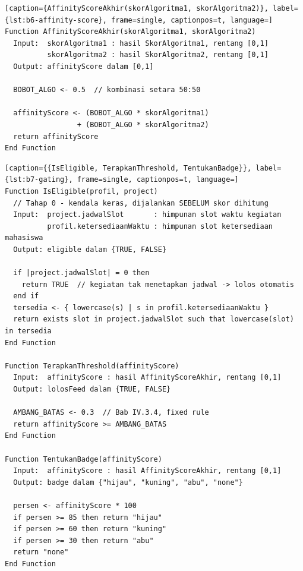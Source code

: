 \begin{minipage}{\textwidth}
\begin{lstlisting}[caption={AffinityScoreAkhir(skorAlgoritma1, skorAlgoritma2)}, label={lst:b6-affinity-score}, frame=single, captionpos=t, language=]
Function AffinityScoreAkhir(skorAlgoritma1, skorAlgoritma2)
  Input:  skorAlgoritma1 : hasil SkorAlgoritma1, rentang [0,1]
          skorAlgoritma2 : hasil SkorAlgoritma2, rentang [0,1]
  Output: affinityScore dalam [0,1]

  BOBOT_ALGO <- 0.5  // kombinasi setara 50:50

  affinityScore <- (BOBOT_ALGO * skorAlgoritma1)
                 + (BOBOT_ALGO * skorAlgoritma2)
  return affinityScore
End Function
\end{lstlisting}
\end{minipage}

\begin{minipage}{\textwidth}
\begin{lstlisting}[caption={{IsEligible, TerapkanThreshold, TentukanBadge}}, label={lst:b7-gating}, frame=single, captionpos=t, language=]
Function IsEligible(profil, project)
  // Tahap 0 - kendala keras, dijalankan SEBELUM skor dihitung
  Input:  project.jadwalSlot       : himpunan slot waktu kegiatan
          profil.ketersediaanWaktu : himpunan slot ketersediaan mahasiswa
  Output: eligible dalam {TRUE, FALSE}

  if |project.jadwalSlot| = 0 then
    return TRUE  // kegiatan tak menetapkan jadwal -> lolos otomatis
  end if
  tersedia <- { lowercase(s) | s in profil.ketersediaanWaktu }
  return exists slot in project.jadwalSlot such that lowercase(slot) in tersedia
End Function

Function TerapkanThreshold(affinityScore)
  Input:  affinityScore : hasil AffinityScoreAkhir, rentang [0,1]
  Output: lolosFeed dalam {TRUE, FALSE}

  AMBANG_BATAS <- 0.3  // Bab IV.3.4, fixed rule
  return affinityScore >= AMBANG_BATAS
End Function

Function TentukanBadge(affinityScore)
  Input:  affinityScore : hasil AffinityScoreAkhir, rentang [0,1]
  Output: badge dalam {"hijau", "kuning", "abu", "none"}

  persen <- affinityScore * 100
  if persen >= 85 then return "hijau"
  if persen >= 60 then return "kuning"
  if persen >= 30 then return "abu"
  return "none"
End Function
\end{lstlisting}
\end{minipage}

